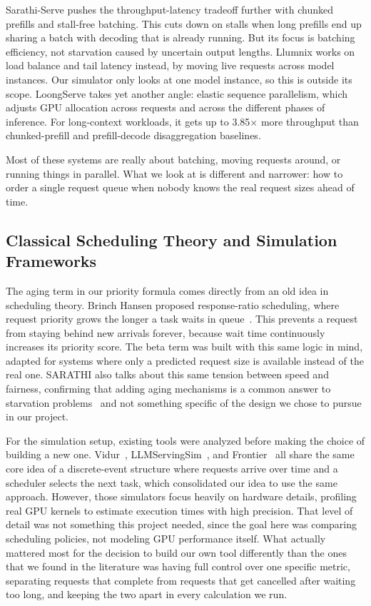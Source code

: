 Sarathi-Serve \cite{agrawal2024sarathiserve} pushes the throughput-latency tradeoff further with chunked prefills and stall-free batching. This cuts down on stalls when long prefills end up sharing a batch with decoding that is already running. But its focus is batching efficiency, not starvation caused by uncertain output lengths. Llumnix \cite{sun2024llumnix} works on load balance and tail latency instead, by moving live requests across model instances. Our simulator only looks at one model instance, so this is outside its scope. LoongServe \cite{jiao2024loongserve} takes yet another angle: elastic sequence parallelism, which adjusts GPU allocation across requests and across the different phases of inference. For long-context workloads, it gets up to 3.85$\times$ more throughput than chunked-prefill and prefill-decode disaggregation baselines.

Most of these systems are really about batching, moving requests around, or running things in parallel. What we look at is different and narrower: how to order a single request queue when nobody knows the real request sizes ahead of time.



\subsection{Classical Scheduling Theory and Simulation Frameworks}

The aging term in our priority formula comes directly from an old idea in scheduling theory. Brinch Hansen proposed response-ratio scheduling, where request priority grows the longer a task waits in queue~\cite{hansen1973os}. This prevents a request from staying behind new arrivals forever, because wait time continuously increases its priority score. The beta term was built with this same logic in mind, adapted for systems where only a predicted request size is available instead of the real one. SARATHI also talks about this same tension between speed and fairness, confirming that adding aging mechanisms is a common answer to starvation problems~\cite{agrawal2023sarathi} and not something specific of the design we chose to pursue in our project.

For the simulation setup, existing tools were analyzed before making the choice of building a new one. Vidur~\cite{agrawal2024vidur}, LLMServingSim~\cite{cho2024llmservingsim}, and Frontier~\cite{feng2026frontier} all share the same core idea of a discrete-event structure where requests arrive over time and a scheduler selects the next task, which consolidated our idea to use the same approach. However, those simulators focus heavily on hardware details, profiling real GPU kernels to estimate execution times with high precision. That level of detail was not something this project needed, since the goal here was comparing scheduling policies, not modeling GPU performance itself. What actually mattered most for the decision to build our own tool differently than the ones that we found in the literature was having full control over one specific metric, separating requests that complete from requests that get cancelled after waiting too long, and keeping the two apart in every calculation we run.
